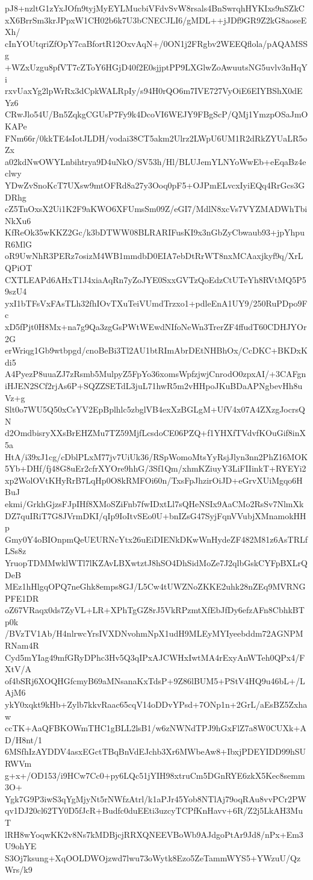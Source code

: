 pJ8+nzltG1zYxJOfn9tyjMyEYLMucbiVFdvSvW8rsals4BnSwrqhHYKIxs9nSZkC
xX6BrrSm3krJPpxW1CH02b6k7U3bCNECJLI6/gMDL++jJDf9GR9Z2kG8aoseEXh/
cInYOUtqriZfOpY7caBfortR12OxvAqN+/0ON1j2FRgbv2WEEQflola/pAQAMSSg
+WZxUzgu8pfVT7cZToY6HGjD40f2E0sjjptPP9LXGlwZoAwuutsNG5uvlv3nHqYi
rxvUaxYg2lpWrRx3dCpkWALRpIy/s94H0rQO6m7IVE727VyOiE6EIYBShX0dEYz6
CRwJlo54U/Bn5ZqkgCGUsP7Fy9k4DcoVI6WEJY9FBgScP/QMj1YmzpOSaJmOKAPe
FNm66r/0kkTE4sIotJLDH/vodai38CT5akm2Ulrz2LWpU6UM1R2dRkZYUaLR5oZx
a02kdNwOWYLnbihtrya9D4uNkO/SV53h/Hl/BLUJemYLNYoWwEb+eEqaBz4eclwy
YDwZvSnoKcT7UXsw9mtOFRd8a27y3Ooq0pF5+OJPmELvcxIyiEQq4RrGcs3GDRhg
cZ5TnOxsX2Ui1K2F9aKWO6XFUmsSm09Z/eGI7/MdlN8xcVs7VYZMADWhTbiNkXu6
KfReOk35wKKZ2Gc/k3bDTWW08BLRARIFusKI9x3nGbZyCbwaub93+jpYhpuR6MlG
oR9UwNhR3PERz7osizM4WB1mmdbD0EIA7ebDtRrWT8nxMCAaxjkyf9q/XrLQPiOT
CXTLEAPd6AHxT1J4xiaAqRn7yZoJYE0SxxGVTzQoEdzCtUTeYh8RVtMQ5P59szU4
yxI1bTFsVxFAsTLh32fhIOvTXuTeiVUmdTrzxo1+pdleEnA1UY9/250RuPDpo9Fc
xD5fPjt0H8Mx+na7g9Qa3zgGsPWtWEwdNIfoNeWn3TrerZF4ffudT60CDHJYOr2G
erWriqg1Gb9wtbpgd/cnoBeBi3Tl2AU1btRImAbrDEtNHBhOx/CcDKC+BKDxKdi5
A4PyezP8uuaZJ7zRsmb5MulpyZ5FpYo36xomsWpfzjwjCnrodO0zpxAI/+3CAFgn
iHJEN2SCf2rjAs6P+SQZZSETdL3juL71hwR5m2vHHpoJKuBDaAPNgbevHh8uVz+g
Slt0o7WU5Q50xCsYV2EpBplhlc5zbglVB4exXzBGLgM+UfV4x07A4ZXzgJocrsQN
d2OmdbisryXXsBrEHZMu7TZ59MjfLcsdoCE06PZQ+f1YHXfTVdvfKOuGif8inX5a
HtA/i39xJ1cg/cDblPLxM77jv7UiUk36/RSpWomoMtsYyRsjJlyn3nn2PhZ16MOK
5Yb+DHf/fj48G8uEr2cfrXYOre9hhG/3Sf1Qm/xhmKZiuyY3LiFIIinkT+RYEYi2
xp2WolOVtKHyRrB7LqHp0O8kRMFOi60n/TxsFpJhzirOiJD+eGrvXUiMgqo6HBuJ
ekmi/GrkhGjzsFJpIHf8XMoSZiFnb7fwIDxtLl7sQHeNSIx9AaCMo2RsSv7NlmXk
DZ7quIRiT7G8JVrmDKI/qIp9IoItvSEo0U+bnIZsG47SyjFqnVVubjXMnamokHHp
Gmy0Y4oBIOnpmQeUEURNcYtx26uEiDIENkDKwWnHydeZF482M81z6AsTRLfLSs8z
YruopTDMMwklWTl7lKZAvLBXwtztJ8hSO4DhSidMoZe7J2qlbGskCYFpBXLrQDeB
MEz1hHlgqOPQ7neGhk8emps8GJ/L5Cw4tUWZNoZKKE2uhk28nZEq9MVRNGPFE1DR
oZ67VRaqx0ds7ZyVL+LR+XPhTgGZ8rJ5VkRPzmtXfEbJfDy6efzAFn8CbhkBTp0k
/BVzTV1Ab/H4nlrwcYrsIVXDNvohmNpX1udH9MLEyMYIyeebddm72AGNPMRNam4R
Cyd5mYIag49mfGRyDPhc3Hv5Q3qIPxAJCWHxIwtMA4rExyAnWTeh0QPx4/FXtV/A
of4bSRj6XOQHGfcmyB69aMNsanaKxTdsP+9Z86lBUM5+PStV4HQ9u46bL+/LAjM6
ykY0xqkt9kHb+Zylb7kkvRaac65cqV14oDDvYPsd+7ONp1n+2GrL/aEsBZ5Zxhaw
ccTK+AaQFBKOWmTHC1gBLL2lsB1/w6zNWNdTPJ9hGxFlZ7a8W0CUXk+AD/H8nt/1
6MSfhIzAYDDV4asxEGctTBqBnVdEJchb3Xr6MWbeAw8+IbxjPDEYIDD99hSURWVm
g+x+/OD153/i9HCw7Cc0+py6LQc51jYIH98xtruCm5DGnRYE6zkX5Kec8semm3O+
Ygk7G9P3iwS3qYgMjyNt5rNWfzAtrl/k1aPJr45Yob8NTlAj79oqRAu8vvPCr2PW
qv1DJ20cl62TY0D5fJcR+Budfc0duEEti3uzcyTCPfKnHavv+6R/Z2j5LkAH3MuT
lRH8wYoqwKK2v8Ns7kMDBjcjRRXQNEEVBoWb9AJdgoPtAr9Jd8/nPx+Em3U9ohYE
S3Oj7ksung+XqOOLDWOjzwd7lwu73oWytk8Ezo5ZeTammWYS5+YWzuU/QzWrs/k9
